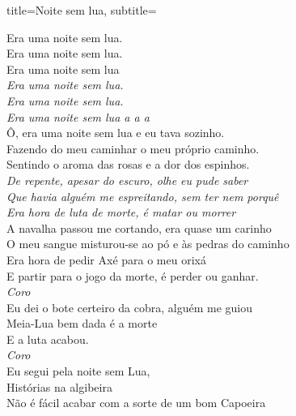 \documentclass[fontsize=14pt, paper=a4, twoside, DIV=20]{scrreprt} %
\begin{document}
\begin{multicols*}{2}
\begin{song}{title={Noite sem lua}, subtitle={\begin{small}
\end{small}}}
       \begin{verse*}
            Era uma noite sem lua.\\
            Era uma noite sem lua.\\
            Era uma noite sem lua\\
            \textit{Era uma noite sem lua.\\
            Era uma noite sem lua.\\
            Era uma noite sem lua a a a}\\

            Ô, era uma noite sem lua e eu tava sozinho.\\
            Fazendo do meu caminhar o meu próprio caminho.\\
            Sentindo o aroma das rosas e a dor dos espinhos.\\

            \textit{
            De repente, apesar do escuro, olhe eu pude saber\\
            Que havia alguém me espreitando, sem ter nem porquê\\
            Era hora de luta de morte, é matar ou morrer}\\

            A navalha passou me cortando, era quase um carinho\\
            O meu sangue misturou-se ao pó e às pedras do caminho\\
            Era hora de pedir Axé para o meu orixá\\
            E partir para o jogo da morte, é perder ou ganhar.\\

            \textit{Coro}\\
            Eu dei o bote certeiro da cobra, alguém me guiou\\
            Meia-Lua bem dada é a morte\\
            E a luta acabou.\\

            \textit{Coro}\\
            Eu segui pela noite sem Lua,\\
            Histórias na algibeira\\
            Não é fácil acabar com a sorte de um bom Capoeira\\
            

\end{verse*}
\end{song}
\end{multicols*}
\end{document}
